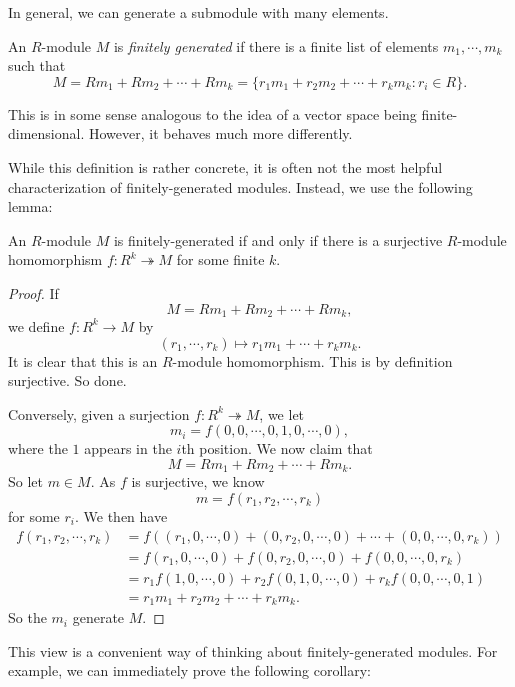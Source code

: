 \documentclass[a4paper]{article}
\begin{document}
In general, we can generate a submodule with many elements.
\begin{defi}
  An $R$-module $M$ is \emph{finitely generated} if there is a finite list of elements $m_1, \cdots, m_k$ such that
  \[
    M = Rm_1 + Rm_2 + \cdots + Rm_k = \{r_1 m_1 + r_2 m_2 + \cdots + r_k m_k: r_i \in R\}.
  \]
\end{defi}
This is in some sense analogous to the idea of a vector space being finite-dimensional. However, it behaves much more differently.

While this definition is rather concrete, it is often not the most helpful characterization of finitely-generated modules. Instead, we use the following lemma:
\begin{lemma}
  An $R$-module $M$ is finitely-generated if and only if there is a surjective $R$-module homomorphism $f: R^k \twoheadrightarrow M$ for some finite $k$.
\end{lemma}

\begin{proof}
  If
  \[
    M = R m_1 + R m_2 + \cdots + R m_k,
  \]
  we define $f: R^k \to M$ by
  \[
    (r_1, \cdots, r_k) \mapsto r_1 m_1 + \cdots + r_k m_k.
  \]
  It is clear that this is an $R$-module homomorphism. This is by definition surjective. So done.

  Conversely, given a surjection $f: R^k \twoheadrightarrow M$, we let
  \[
    m_i = f(0, 0, \cdots, 0, 1, 0, \cdots, 0),
  \]
  where the $1$ appears in the $i$th position. We now claim that
  \[
    M = R m_1 + R m_2 + \cdots + R m_k.
  \]
  So let $m \in M$. As $f$ is surjective, we know
  \[
    m = f(r_1, r_2, \cdots, r_k)
  \]
  for some $r_i$. We then have
  \begin{align*}
    f(r_1, r_2, \cdots, r_k) &= f((r_1, 0, \cdots, 0) + (0, r_2, 0, \cdots, 0) + \cdots + (0, 0, \cdots, 0, r_k))\\
    &= f(r_1, 0, \cdots, 0) + f(0, r_2, 0, \cdots, 0) + f(0, 0, \cdots, 0, r_k)\\
    &= r_1 f(1, 0, \cdots, 0) + r_2 f(0, 1, 0, \cdots, 0) + r_k f(0, 0, \cdots, 0, 1)\\
    &= r_1 m_1 + r_2 m_2 + \cdots + r_k m_k.
  \end{align*}
  So the $m_i$ generate $M$.
\end{proof}
This view is a convenient way of thinking about finitely-generated modules. For example, we can immediately prove the following corollary:
\end{document}
